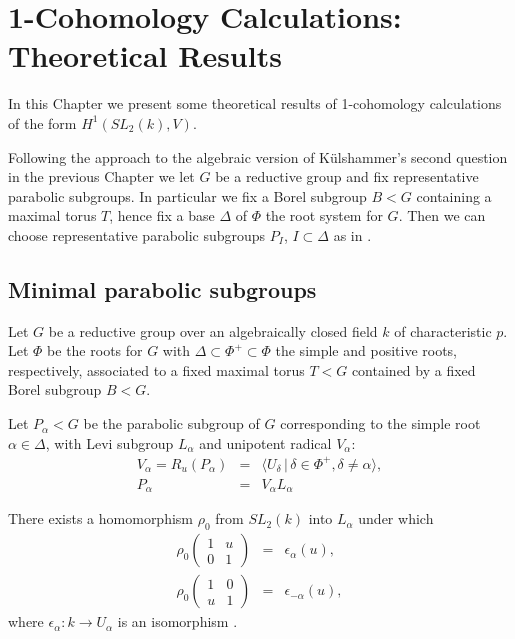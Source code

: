 
\chapter{1-Cohomology Calculations: Theoretical Results}
\label{Chapter5}

In this Chapter we present some theoretical results of 1-cohomology calculations of the form $H^1(SL_2(k), V)$. 

Following the approach to the algebraic version of K\"ulshammer's second question in the previous Chapter we let $G$ be a reductive group and fix representative parabolic subgroups. In particular we fix a Borel subgroup $B<G$ containing a maximal torus $T$, hence fix a base $\Delta$ of $\Phi$ the root system for $G$. Then we can choose representative parabolic subgroups $P_I$, $I \subset \Delta$ as in \cite[\S 30]{humphreys1975linear}.

\section{Minimal parabolic subgroups}

Let $G$ be a reductive group over an algebraically closed field $k$ of characteristic $p$. Let $\Phi$ be the roots for $G$ with $\Delta \subset \Phi^+ \subset \Phi$ the simple and positive roots, respectively, associated to a fixed maximal torus $T < G$ contained by a fixed Borel subgroup $B < G$.

Let $P_\alpha<G$ be the parabolic subgroup of $G$ corresponding to the simple root $\alpha\in\Delta$, with Levi subgroup $L_\alpha$ and unipotent radical $V_\alpha$:
\begin{eqnarray*}
V_\alpha=R_u(P_\alpha) &=& \langle U_\delta \,|\, \delta \in \Phi^+, \delta \neq \alpha \rangle,\\
P_\alpha &=& V_\alpha L_\alpha 
\end{eqnarray*}

There exists a homomorphism $\rho_0$ from $ SL_2(k)$ into $L_\alpha$ under which
\begin{eqnarray*}
\rho_0 \left(\begin{matrix} 1 &  u \\ 0 & 1 \end{matrix} \right) &=& \epsilon_\alpha(u), \\
\rho_0 \left(\begin{matrix} 1 & 0 \\ u & 1 \end{matrix} \right) &=& \epsilon_{-\alpha}(u),
\end{eqnarray*}
where $\epsilon_\alpha : k \rightarrow U_\alpha$ is an isomorphism \cite[Theorem 26.3(c)]{humphreys1975linear}.

